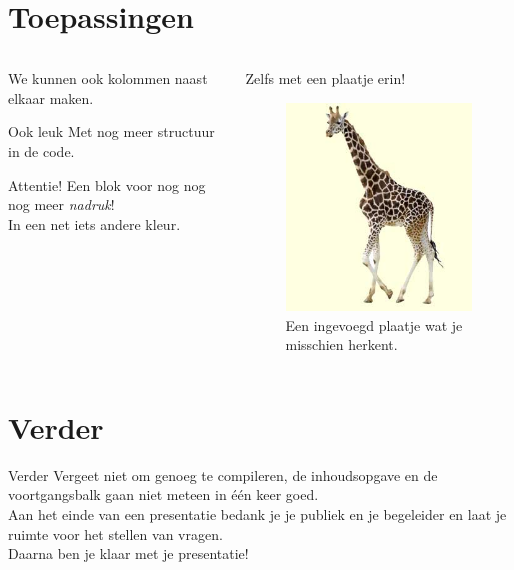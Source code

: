\documentclass{beamer}
\theoremstyle{definition}
\theoremstyle{example}
\begin{document}
\section{Toepassingen}
\begin{frame}
\begin{columns}[T]
	\begin{column}[T]{5cm}
		We kunnen ook kolommen naast elkaar maken.\\
		\begin{block}{Ook leuk}
			Met nog meer structuur in de code.
		\end{block}
		\begin{alertblock}{Attentie!}
			Een blok voor nog nog nog meer \emph{nadruk}!\\
			In een net iets andere kleur.
		\end{alertblock}
	\end{column}
	\begin{column}[T]{5cm}
		Zelfs met een plaatje erin!
		\begin{figure}
			\includegraphics[scale=0.4]{Giraffe_klein.jpg}
			\caption{Een ingevoegd plaatje wat je misschien herkent.}
		\end{figure}
		
	\end{column}
\end{columns}
\end{frame}


\section{Verder}


\begin{frame}{Verder}
Vergeet niet om genoeg te compileren, de inhoudsopgave en de voortgangsbalk gaan niet meteen in \'e\'en keer goed.\\
Aan het einde van een presentatie bedank je je publiek en je begeleider en laat je ruimte voor het stellen van vragen.\\
Daarna ben je klaar met je presentatie!
\end{frame}
\end{document}
